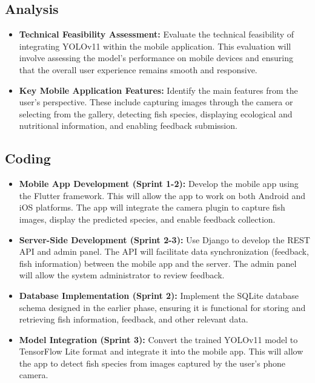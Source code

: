 \subsection{Analysis}
\begin{itemize}
    \item \textbf{Technical Feasibility Assessment:}
    Evaluate the technical feasibility of integrating YOLOv11 within the mobile application. This evaluation will involve assessing the model’s performance on mobile devices and ensuring that the overall user experience remains smooth and responsive.

     \item \textbf{Key Mobile Application Features:} 
    Identify the main features from the user's perspective. These include capturing images through the camera or selecting from the gallery, detecting fish species, displaying ecological and nutritional information, and enabling feedback submission.
\end{itemize}

\subsection{Coding}
\begin{itemize}
 \item \textbf{Mobile App Development (Sprint 1-2):} Develop the mobile app using the Flutter framework. This will allow the app to work on both Android and iOS platforms. The app will integrate the camera plugin to capture fish images, display the predicted species, and enable feedback collection.
 \item \textbf{Server-Side Development (Sprint 2-3):} Use Django to develop the REST API and admin panel. The API will facilitate data synchronization (feedback, fish information) between the mobile app and the server. The admin panel will allow the system administrator to review feedback.
 \item \textbf{Database Implementation (Sprint 2):} Implement the SQLite database schema designed in the earlier phase, ensuring it is functional for storing and retrieving fish information, feedback, and other relevant data.
 \item \textbf{Model Integration (Sprint 3):} Convert the trained YOLOv11 model to TensorFlow Lite format and integrate it into the mobile app. This will allow the app to detect fish species from images captured by the user’s phone camera.
\end{itemize}

